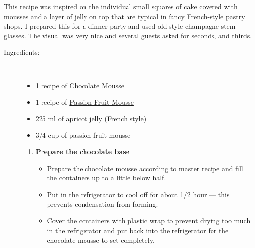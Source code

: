 \documentclass[11pt,letterpaper]{article}
\begin{document}



This recipe was inspired on the individual small squares of cake covered with mousses and a layer of jelly on top that are typical in fancy French-style pastry shops. I prepared this for a dinner party and used old-style champagne stem glasses. The visual was very nice and several guests asked for seconds, and thirds.
	
\begin{description}
\item[Ingredients:]\ \\
	\begin{itemize}
	\item 1 recipe of \href{ChocolateMousse.html}{Chocolate Mousse}
	\item  1 recipe of \href{PassionFruitMousse.html}{Passion Fruit Mousse}
	\item 225 ml of apricot jelly (French style)
	\item 3/4 cup of passion fruit mousse
	\end{itemize}

	\begin{enumerate}
	\item {\bf Prepare the chocolate base}
		\begin{itemize}
		\item Prepare the chocolate mousse according to master recipe and fill the containers up to a little below half.
		\item Put in the refrigerator to cool off for about 1/2 hour --- this prevents condensation from forming.
		\item Cover the containers with plastic wrap to prevent drying too much in the refrigerator and put back into the refrigerator for the chocolate mousse to set completely.
		\end{itemize}


\end{enumerate}
\end{description}
\end{document}
